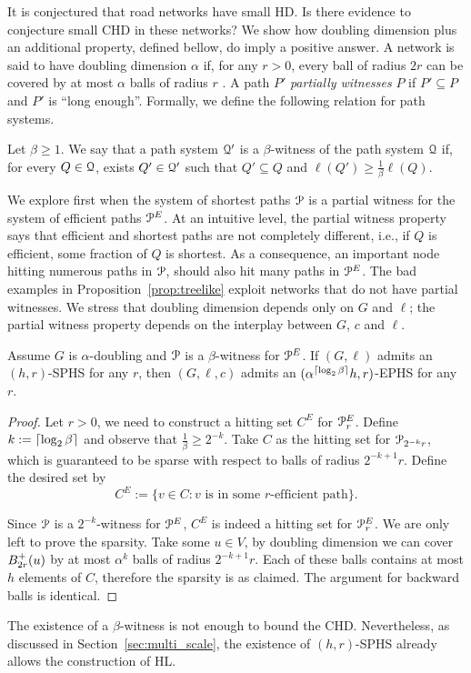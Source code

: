 It is conjectured that road networks have small HD.
Is there evidence to conjecture small CHD in these networks?
We show how doubling dimension plus an additional property, defined bellow, do imply a positive answer.
A network is said to have doubling dimension $\alpha$ if, for any $r>0$, every ball of radius $2r$ can be covered by at most $\alpha$ balls of radius $r$ .
A path $P'$ \emph{partially witnesses} $P$ if $P'\subseteq P$ and $P'$ is ``long enough''.
Formally, we define the following relation for path systems.

\begin{definition}
Let $\beta\geq 1$.
We say that a path system $\mathcal{Q}'$ is a $\beta$-witness of the path system $\mathcal{Q}$ if, for every $Q\in\mathcal{Q}$, exists $Q'\in\mathcal{Q}'$ such that $Q'\subseteq Q$ and $\ell(Q')\geq \frac{1}{\beta}\ell(Q)$.
\end{definition}

We explore first when the system of shortest paths $\mathcal{P}$ is a partial witness for the system of efficient paths $\mathcal{P}^E$.
At an intuitive level, the partial witness property says that efficient and shortest paths are not completely different, i.e., if $Q$ is efficient, some fraction of $Q$ is shortest.
As a consequence, an important node hitting numerous paths in $\mathcal{P}$, should also hit many paths in $\mathcal{P}^E$.
The bad examples in Proposition~\ref{prop:treelike} exploit networks that do not have partial witnesses.
We stress that doubling dimension depends only on $G$ and $\ell$; the partial witness property depends on the interplay between $G$, $c$ and $\ell$.

\begin{proposition}\label{prop:doubling}
Assume $G$ is $\alpha$-doubling and $\mathcal{P}$ is a $\beta$-witness for $\mathcal{P}^E$.
If $(G,\ell)$ admits an $(h,r)$-SPHS for any $r$, then $(G,\ell,c)$ admits an $(\alpha^{\lceil\log_2\beta\rceil} h,r)$-EPHS for any $r$.
\end{proposition}
\begin{proof}
Let $r>0$, we need to construct a hitting set $C^E$ for $\mathcal{P}_r^E$.
Define $k:=\lceil\log_2\beta\rceil$ and observe that $\frac{1}{\beta}\geq 2^{-k}$.
Take $C$ as the hitting set for $\mathcal{P}_{2^{-k}r}$, which is guaranteed to be sparse with respect to balls of radius $2^{-k+1}r$.
Define the desired set by
\[
C^E:=\{v\in C: v \text{ is in some $r$-efficient path} \}.
\]

Since $\mathcal{P}$ is a $2^{-k}$-witness for $\mathcal{P}^E$, $C^E$ is indeed a hitting set for $\mathcal{P}^E_r$.
We are only left to prove the sparsity.
Take some $u\in V$, by doubling dimension we can cover $B^+_{2r}(u)$ by at most $\alpha^k$ balls of radius $2^{-k+1}r$.
Each of these balls contains at most $h$ elements of $C$, therefore the sparsity is as claimed.
The argument for backward balls is identical.
\end{proof}

\begin{remark}
The existence of a $\beta$-witness is not enough to bound the CHD.
Nevertheless, as discussed in Section~\ref{sec:multi_scale}, the existence of $(h,r)$-SPHS already allows the construction of HL.
\end{remark}